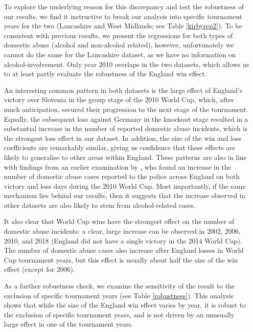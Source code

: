 \documentclass[12pt, a4paper]{article}
\begin{document}
To explore the underlying reason for this discrepancy and test the robustness of our results, we find it instructive to break our analysis into specific tournament years for the two (Lancashire and West Midlands; see Table \ref{kirbyrep2}). To be consistent with previous results, we present the regressions for both types of domestic abuse (alcohol and non-alcohol related), however, unfortunately we cannot do the same for the Lancashire dataset, as we have no information on alcohol-involvement. Only year 2010 overlaps in the two datasets, which allows us to at least partly evaluate the robustness of the England win effect.

 An interesting common pattern in both datasets is the large effect of England's victory over Slovenia in the group stage of the 2010 World Cup, which, after much anticipation, secured their progression to the next stage of the tournament. Equally, the subsequent loss against Germany in the knockout stage resulted in a substantial increase in the number of reported domestic abuse incidents, which is the strongest loss effect in our dataset. In addition, the size of the win and loss coefficients are remarkably similar, giving us confidence that these effects are likely to generalise to other areas within England. These patterns are also in line with findings from an earlier examination by \cite{Brimicombe2012}, who found an increase in the number of domestic abuse cases reported to the police across England on both victory and loss days during the 2010 World Cup.  Most importantly, if the same mechanism lies behind our results, then it suggests that the increase observed in other datasets are also likely to stem from alcohol-related cases. 
   
  It also clear that World Cup wins have the strongest effect on the number of domestic abuse incidents: a clear, large increase can be observed in 2002, 2006, 2010, and 2018 (England did not have a single victory in the 2014 World Cup). The number of domestic abuse cases also increase after England losses in World Cup tournament years, but this effect is usually about half the size of the win effect (except for 2006).
  
  As a further robustness check, we examine the sensitivity of the result to the exclusion of specific tournament years  (see Table \ref{robustness}). This analysis shows that while the size of the England win effect varies by year, it is robust to the exclusion of specific tournament years, and is not driven by an unusually large effect in one of the tournament years.
\end{document}
